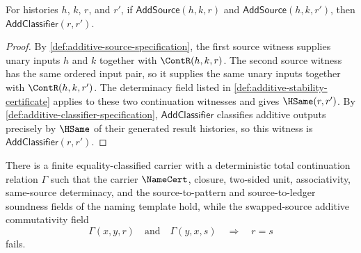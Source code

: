 \begin{theorem}
\label{thm:same-source-additive-determinacy-bridge}
For histories \(h\), \(k\), \(r\), and \(r'\), if \(\mathsf{AddSource}(h,k,r)\) and \(\mathsf{AddSource}(h,k,r')\), then \(\mathsf{AddClassifier}(r,r')\).
\end{theorem}
\begin{proof}
By \autoref{def:additive-source-specification}, the first source witness supplies unary inputs \(h\) and \(k\) together with \(\ContR(h,k,r)\). The second source witness has the same ordered input pair, so it supplies the same unary inputs together with \(\ContR(h,k,r')\). The determinacy field listed in \autoref{def:additive-stability-certificate} applies to these two continuation witnesses and gives \(\HSame(r,r')\). By \autoref{def:additive-classifier-specification}, \(\mathsf{AddClassifier}\) classifies additive outputs precisely by \(\HSame\) of their generated result histories, so this witness is \(\mathsf{AddClassifier}(r,r')\).
\end{proof}

\begin{theorem}
\label{thm:core-additive-stability-not-swapped-commutative}
There is a finite equality-classified carrier with a deterministic total continuation relation $\Gamma$ such that the carrier $\NameCert$, closure, two-sided unit, associativity, same-source determinacy, and the source-to-pattern and source-to-ledger soundness fields of the naming template hold, while the swapped-source additive commutativity field
$$
  \Gamma(x,y,r)\quad\text{and}\quad \Gamma(y,x,s)\quad\Rightarrow\quad r=s
$$
fails.
\end{theorem}

